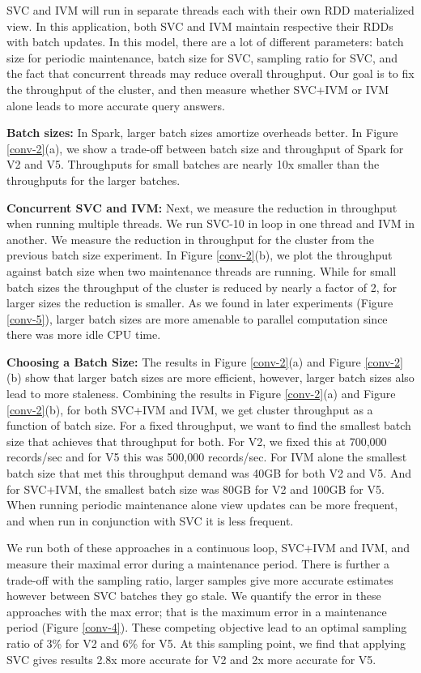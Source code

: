 SVC and IVM will run in separate threads each with their own RDD materialized view.
In this application, both SVC and IVM maintain respective their RDDs with batch updates.
In this model, there are a lot of different parameters: batch size for periodic maintenance, batch size for SVC, sampling ratio for SVC, and the fact that concurrent threads may reduce overall throughput.
Our goal is to fix the throughput of the cluster, and then measure whether SVC+IVM or IVM alone leads to more accurate query answers.

\textbf{Batch sizes:} In Spark, larger batch sizes amortize overheads better.
In Figure \ref{conv-2}(a), we show a trade-off between batch size and throughput of Spark for V2 and V5.
Throughputs for small batches are nearly 10x smaller than the throughputs for the larger batches. 

\textbf{Concurrent SVC and IVM:} Next, we measure the reduction in throughput when running multiple threads.
We run SVC-10 in loop in one thread and IVM in another.
We measure the reduction in throughput for the cluster from the previous batch size experiment.
In Figure \ref{conv-2}(b), we plot the throughput against batch size when two maintenance threads are running.
While for small batch sizes the throughput of the cluster is reduced by nearly a factor of 2, for larger sizes the reduction is
smaller.
As we found in later experiments (Figure \ref{conv-5}), larger batch sizes are more amenable to parallel computation since there was more idle CPU time.

\textbf{Choosing a Batch Size:}
The results in Figure \ref{conv-2}(a) and Figure \ref{conv-2}(b) show that larger batch sizes are more efficient, however, larger batch sizes also lead to more staleness.
Combining the results in Figure \ref{conv-2}(a) and Figure \ref{conv-2}(b), for both SVC+IVM and IVM, we get cluster throughput as a function of batch size.
For a fixed throughput, we want to find the smallest batch size that achieves that throughput for both.
For V2, we fixed this at 700,000 records/sec and for V5 this was 500,000 records/sec.
For IVM alone the smallest batch size that met this throughput demand was 40GB for both V2 and V5.
And for SVC+IVM, the smallest batch size was 80GB for V2 and 100GB for V5. 
When running periodic maintenance alone view updates can be more frequent, and when run in conjunction with SVC it is less frequent. 

We run both of these approaches in a continuous loop, SVC+IVM and IVM, and measure their maximal error during a maintenance period.
There is further a trade-off with the sampling ratio, larger samples give more accurate estimates however between SVC batches they go stale.
We quantify the error in these approaches with the max error; that is the maximum error in a maintenance period (Figure \ref{conv-4}).
These competing objective lead to an optimal sampling ratio of 3\% for V2 and 6\% for V5.
At this sampling point, we find that applying SVC gives results 2.8x more accurate for V2 and 2x more accurate for V5.

